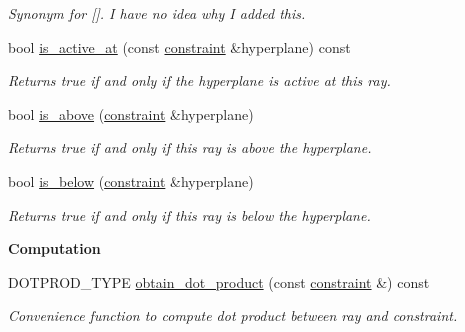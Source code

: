 \begin{Indent}
\begin{DoxyCompactItemize}
\begin{DoxyCompactList}\small\item\em Synonym for \mbox{[}\mbox{]}. I have no idea why I added this. \end{DoxyCompactList}\item 
bool \hyperlink{classray_aa1831b718c9a91d786a1a578cb1cefea}{is\+\_\+active\+\_\+at} (const \hyperlink{classconstraint}{constraint} \&hyperplane) const
\begin{DoxyCompactList}\small\item\em Returns {\ttfamily true} if and only if the hyperplane is active at this ray. \end{DoxyCompactList}\item 
bool \hyperlink{classray_a5d4113ea6249145c337f4d26a54eb940}{is\+\_\+above} (\hyperlink{classconstraint}{constraint} \&hyperplane)
\begin{DoxyCompactList}\small\item\em Returns {\ttfamily true} if and only if this ray is above the hyperplane. \end{DoxyCompactList}\item 
bool \hyperlink{classray_a08f0af168bb0a86db612fdd3ce22045b}{is\+\_\+below} (\hyperlink{classconstraint}{constraint} \&hyperplane)
\begin{DoxyCompactList}\small\item\em Returns {\ttfamily true} if and only if this ray is below the hyperplane. \end{DoxyCompactList}\end{DoxyCompactItemize}
\end{Indent}
\begin{Indent}\textbf{ Computation}\par
\begin{DoxyCompactItemize}
\item 
D\+O\+T\+P\+R\+O\+D\+\_\+\+T\+Y\+PE \hyperlink{classray_a25f56f0f7acafe000f98550af47b7da9}{obtain\+\_\+dot\+\_\+product} (const \hyperlink{classconstraint}{constraint} \&) const
\begin{DoxyCompactList}\small\item\em Convenience function to compute dot product between ray and constraint. \end{DoxyCompactList}\end{DoxyCompactItemize}
\end{Indent}
